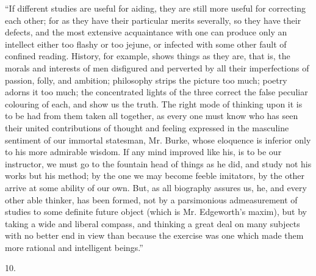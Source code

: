 ``If different studies are useful for aiding, they are still
more useful for correcting each other; for as they have their
particular merits severally, so they have their defects, and the most
extensive acquaintance with one can produce only an intellect either
too flashy or too jejune, or infected with some other fault of
confined reading. History, for example, shows things as they are, that
is, the morals and interests of men disfigured and perverted by all
their imperfections of passion, folly, and ambition; philosophy strips
the picture too much; poetry adorns it too much; the concentrated
lights of the three correct the false peculiar colouring of each, and
show us the truth. The right mode of thinking upon it is to be had
from them taken all together, as every one must know who has seen
their united contributions of thought and feeling expressed in the
masculine sentiment of our immortal statesman, Mr. Burke, whose
eloquence is inferior only to his more admirable wisdom. If any mind
improved like his, is to be our instructor, we must go to the fountain
head of things as he did, and study not his works but his method; by
the one we may become feeble imitators, by the other arrive at some
ability of our own. But, as all biography assures us, he, and every
other able thinker, has been formed, not by a parsimonious
admeasurement of studies to some definite future object (which is Mr.
Edgeworth's maxim), but by taking a wide and liberal compass, and
thinking a great deal on many subjects with no better end in
view than because the exercise was one which made them more rational
and intelligent beings.''

10.

